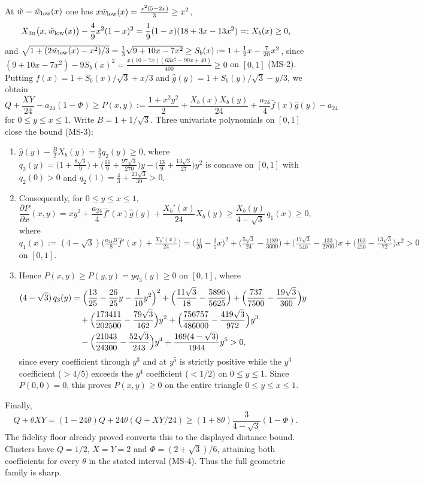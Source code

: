 At $\tilde w=\tilde w_{\rm low}(x)$ one has $x\tilde w_{\rm low}(x)=\frac{x^2(5-2x)}{3}\ge x^2$,
\[
 X_{\rm lin}\bigl(x,\tilde w_{\rm low}(x)\bigr)-\frac49x^2(1-x)^2
 =\frac19(1-x)(18+3x-13x^2)=:X_b(x)\ge0,
\]
and $\sqrt{1+(2\tilde w_{\rm low}(x)-x^2)/3}=\frac13\sqrt{9+10x-7x^2}\ge S_b(x):=1+\frac12x-\frac7{20}x^2$,
since $(9+10x-7x^2)-9S_b(x)^2=\frac{x(10-7x)(63x^2-90x+40)}{400}\ge0$ on $[0,1]$ (MS-2).
Putting $\hat f(x)=1+S_b(x)/\sqrt3+x/3$ and $\hat g(y)=1+S_b(y)/\sqrt3-y/3$, we obtain
\begin{equation}\label{eq:fqe-null-mixed-certificate}
 Q+\frac{XY}{24}-a_{24}(1-\Phi)
 \ge P(x,y):=\frac{1+x^2y^2}{2}+\frac{X_b(x)X_b(y)}{24}+\frac{a_{24}}{4}\hat f(x)\hat g(y)-a_{24}
\end{equation}
for $0\le y\le x\le1$. Write $B=1+1/\sqrt3$. Three univariate polynomials on $[0,1]$ close the bound (MS-3):
\begin{enumerate}
\item $\hat g(y)-\frac B2 X_b(y)=\frac y2 q_2(y)\ge0$, where
 $q_2(y)=\bigl(1+\frac{8\sqrt3}{9}\bigr)+\bigl(\frac{16}{9}+\frac{97\sqrt3}{270}\bigr)y-\bigl(\frac{13}{9}+\frac{13\sqrt3}{27}\bigr)y^2$
 is concave on $[0,1]$ with $q_2(0)>0$ and $q_2(1)=\frac43+\frac{23\sqrt3}{30}>0$.
\item Consequently, for $0\le y\le x\le1$,
 \[
  \frac{\partial P}{\partial x}(x,y)
  =xy^2+\frac{a_{24}}{4}\hat f'(x)\hat g(y)+\frac{X_b'(x)}{24}X_b(y)
  \ge\frac{X_b(y)}{4-\sqrt3}\,q_1(x)\ge0,
 \]
 where $q_1(x):=(4-\sqrt3)\bigl(\frac{a_{24}B}{8}\hat f'(x)+\frac{X_b'(x)}{24}\bigr)
 =\bigl(\frac{11}{20}-\frac35x\bigr)^2+\bigl(\frac{5\sqrt3}{24}-\frac{1189}{3600}\bigr)
 +\bigl(\frac{17\sqrt3}{540}-\frac{133}{2700}\bigr)x+\bigl(\frac{163}{450}-\frac{13\sqrt3}{72}\bigr)x^2>0$ on $[0,1]$.
\item Hence $P(x,y)\ge P(y,y)=yq_3(y)\ge0$ on $[0,1]$, where
 \begin{align*}
  (4-\sqrt3)\,q_3(y)
  &=\Bigl(\frac{13}{25}-\frac{26}{25}y-\frac1{10}y^2\Bigr)^2
   +\Bigl(\frac{11\sqrt3}{18}-\frac{5896}{5625}\Bigr)
   +\Bigl(\frac{737}{7500}-\frac{19\sqrt3}{360}\Bigr)y\\
  &\quad+\Bigl(\frac{173411}{202500}-\frac{79\sqrt3}{162}\Bigr)y^2
   +\Bigl(\frac{756757}{486000}-\frac{419\sqrt3}{972}\Bigr)y^3\\
  &\quad-\Bigl(\frac{21043}{24300}-\frac{52\sqrt3}{243}\Bigr)y^4
   +\frac{169(4-\sqrt3)}{1944}y^5>0,
 \end{align*}
 since every coefficient through $y^3$ and at $y^5$ is strictly positive while the $y^3$ coefficient ($>4/5$)
 exceeds the $y^4$ coefficient ($<1/2$) on $0\le y\le1$. Since $P(0,0)=0$, this proves $P(x,y)\ge0$ on the entire triangle $0\le y\le x\le1$.
\end{enumerate}

Finally,
\[
 Q+\theta XY=(1-24\theta)Q+24\theta(Q+XY/24)
 \ge(1+8\theta)\frac3{4-\sqrt3}(1-\Phi).
\]
The fidelity floor already proved converts this to the displayed distance
bound. Clusters have $Q=1/2$, $X=Y=2$ and
$\Phi=(2+\sqrt3)/6$, attaining both coefficients for every
$\theta$ in the stated interval (MS-4). Thus the full geometric family
is sharp.
